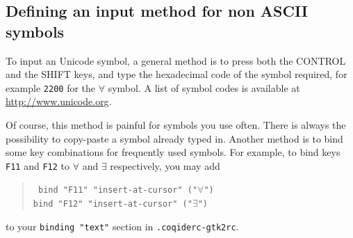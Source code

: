\subsection{Defining an input method for non ASCII symbols}

To input an Unicode symbol, a general method is to press both the
CONTROL and the SHIFT keys, and type the hexadecimal code of the
symbol required, for example \verb|2200| for the $\forall$ symbol.
A list of symbol codes is available at \url{http://www.unicode.org}. 

Of course, this method is painful for symbols you use often. There is
always the possibility to copy-paste a symbol already typed in.
Another method is to bind some key combinations for frequently used
symbols. For example, to bind keys \verb|F11| and \verb|F12| to
$\forall$ and $\exists$ respectively, you may add
\begin{quote}\tt
  bind "F11" {"insert-at-cursor" ("$\forall$")}\\
  bind "F12" {"insert-at-cursor" ("$\exists$")}
\end{quote}
to your \verb|binding "text"| section in \verb|.coqiderc-gtk2rc|.



